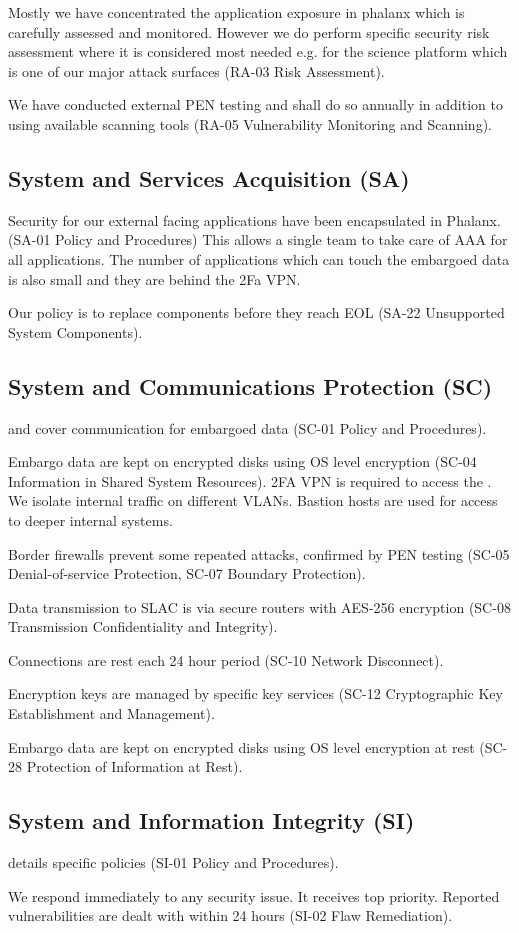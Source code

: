 Mostly we have concentrated the application exposure in phalanx which is carefully assessed and monitored.
However we do perform specific security risk assessment where it is considered most needed e.g.  for the science platform which is one of our major attack surfaces (RA-03  Risk Assessment).

We have conducted external PEN testing and shall do so annually in addition to using available scanning tools (RA-05  Vulnerability Monitoring and Scanning).

\subsection{System and Services Acquisition (SA)} \label{sec:SA}
Security for our external facing applications have been encapsulated in Phalanx. (SA-01  Policy and Procedures)
This allows a single team to take care of AAA for all applications.
The number of applications which can touch the embargoed data is also small and they are behind the 2Fa VPN.

Our policy is to replace components before they reach EOL (SA-22  Unsupported System Components).


\subsection{System and Communications Protection (SC)} \label{sec:SC}
 and  cover communication  for embargoed data (SC-01  Policy and Procedures).

Embargo data are kept on encrypted disks using OS level encryption (SC-04  Information in Shared System Resources).
2FA VPN is required to access the \PZ.
We isolate internal traffic on different VLANs.
Bastion hosts are used for access to deeper internal systems.

Border firewalls prevent some repeated attacks, confirmed by PEN testing (SC-05  Denial-of-service Protection, SC-07  Boundary Protection).

Data transmission to SLAC is via  secure routers with AES-256 encryption (SC-08  Transmission Confidentiality and Integrity).

Connections are rest each 24 hour period (SC-10  Network Disconnect).

Encryption keys are managed by specific key services  (SC-12  Cryptographic Key Establishment and Management).

Embargo data are kept on encrypted disks using OS level encryption at rest (SC-28  Protection of Information at Rest).


\subsection{ System and Information Integrity (SI)} \label{sec:SI}
 details specific policies (SI-01  Policy and Procedures).

We respond immediately to any security issue.
It receives top priority.
Reported vulnerabilities are dealt with within 24 hours (SI-02  Flaw Remediation).


